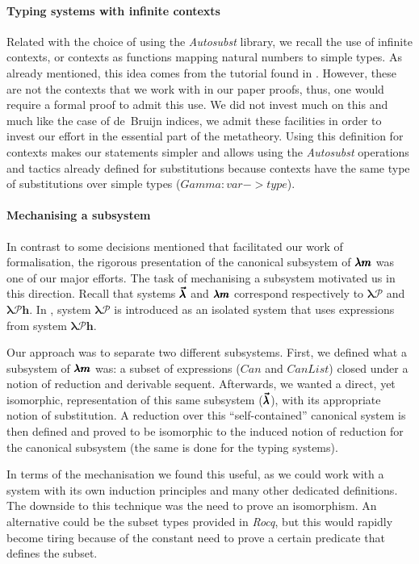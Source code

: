 \paragraph{Typing systems with infinite contexts}
Related with the choice of using the \textit{Autosubst} library, we recall the use of infinite contexts, or contexts as functions mapping natural numbers to simple types.
As already mentioned, this idea comes from the tutorial found in \cite{AutosubstManual}.
However, these are not the contexts that we work with in our paper proofs, thus, one would require a formal proof to admit this use.
We did not invest much on this and much like the case of de~Bruijn indices, we admit these facilities in order to invest our effort in the essential part of the metatheory.
Using this definition for contexts makes our statements simpler and allows using the \textit{Autosubst} operations and tactics already defined for substitutions because contexts have the same type of substitutions over simple types (\lst$Gamma:var->type$).

\paragraph{Mechanising a subsystem}
In contrast to some decisions mentioned that facilitated our work of formalisation, the rigorous presentation of the canonical subsystem of $\pmb{\lambda m}$ was one of our major efforts.
The task of mechanising a subsystem motivated us in this direction.
Recall that systems $\pmb{\vec \lambda}$ and $\pmb{\lambda m}$ correspond respectively to $\pmb{\lambda \mathcal{P}}$ and $\pmb{\lambda \mathcal{P} h}$.
In \cite[Chapter~3]{JCES2002}, system $\pmb{\lambda \mathcal{P}}$ is introduced as an isolated system that uses expressions from system $\pmb{\lambda \mathcal{P} h}$.

Our approach was to separate two different subsystems.
First, we defined what a subsystem of $\pmb{\lambda m}$ was: a subset of expressions ($Can$ and $CanList$) closed under a notion of reduction and derivable sequent.
Afterwards, we wanted a direct, yet isomorphic, representation of this same subsystem ($\pmb{\vec \lambda}$), with its appropriate notion of substitution.
A reduction over this ``self-contained'' canonical system is then defined and proved to be isomorphic to the induced notion of reduction for the canonical subsystem (the same is done for the typing systems).

In terms of the mechanisation we found this useful, as we could work with a system with its own induction principles and many other dedicated definitions.
The downside to this technique was the need to prove an isomorphism.
An alternative could be the subset types provided in \textit{Rocq}, but this would rapidly become tiring because of the constant need to prove a certain predicate that defines the subset.

